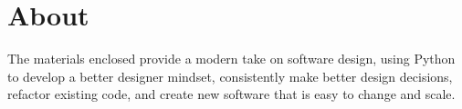 \chapter{About}

\noindent The materials enclosed provide a modern take on software design, using Python to develop a better designer mindset, consistently make better design decisions, refactor existing code, and create new software that is easy to change and scale.
